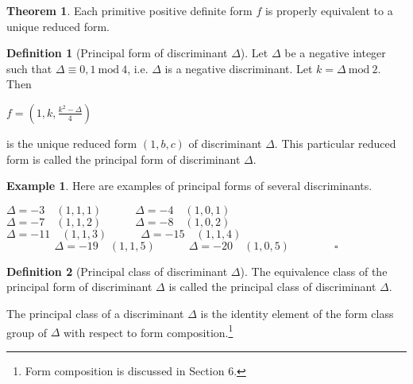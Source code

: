 \documentclass{article}
\theoremstyle{definition}
\newtheorem{definition}{Definition}[section]
\theoremstyle{theorem}
\newtheorem{theorem}{Theorem}[section]
\theoremstyle{example}
\newtheorem{example}{Example}[section]
\theoremstyle{corollary}
\begin{document}
\bigskip

\theoremstyle{theorem}
\begin{theorem}
Each primitive positive definite form \(f\) is properly equivalent to a unique reduced form.
\end{theorem}

\bigskip

\theoremstyle{definition}
\begin{definition}[Principal form of discriminant \(\Delta\)]
Let \(\Delta\) be a negative integer such that \(\Delta \equiv 0, 1 \ \textrm{mod} \ 4\), i.e. \(\Delta\) is a negative discriminant. Let \(k = \Delta \ \textrm{mod} \ 2\). Then
\begin{center}
\(f = \left(1, k, \frac{k^{2} - \Delta}{4}\right)\)
\end{center}
is the unique reduced form \((1, b, c)\) of discriminant \(\Delta\). This particular reduced form is called the principal form of discriminant \(\Delta\).
\end{definition}

\bigskip

\theoremstyle{example}
\begin{example}
Here are examples of principal forms of several discriminants.
\begin{center}
\(\Delta = -3 \quad (1, 1, 1) \quad \quad \quad \Delta = -4 \quad (1, 0, 1)\) \\
\(\Delta = -7 \quad (1, 1, 2) \quad \quad \quad \Delta = -8 \quad (1, 0, 2)\) \\
\(\Delta = -11 \quad (1, 1, 3) \quad \quad \quad \Delta = -15 \quad (1, 1, 4)\) \\
\(\phantom{\quad \quad \quad \quad \square} \Delta = -19 \quad (1, 1, 5) \quad \quad \quad \Delta = -20 \quad (1, 0, 5) \quad \quad \quad \quad \square\)
\end{center}
\end{example}

\bigskip

\theoremstyle{definition}
\begin{definition}[Principal class of discriminant \(\Delta\)]
The equivalence class of the principal form of discriminant \(\Delta\) is called the principal class of discriminant \(\Delta\).
\end{definition}

\bigskip

The principal class of a discriminant \(\Delta\) is the identity element of the form class group of \(\Delta\) with respect to form composition.\footnote{Form composition is discussed in Section 6.}
\end{document}
